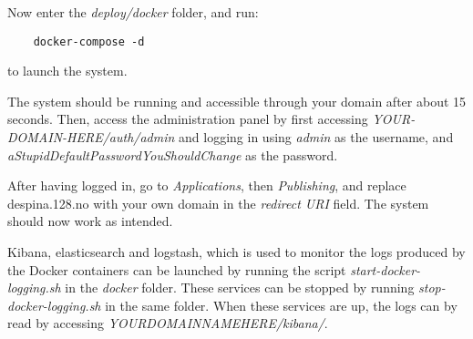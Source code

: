 Now enter the \textit{deploy/docker} folder, and run:
\begin{verbatim}
    docker-compose -d
\end{verbatim}
to launch the system.

The system should be running and accessible through your domain after about 15 seconds. Then, access the administration panel by first accessing \textit{YOUR-DOMAIN-HERE/auth/admin} and logging in using \textit{admin} as the username, and \textit{aStupidDefaultPasswordYouShouldChange} as the password.

After having logged in, go to \textit{Applications}, then \textit{Publishing}, and replace despina.128.no with your own domain in the \textit{redirect URI} field. The system should now work as intended.

Kibana, elasticsearch and logstash, which is used to monitor the logs produced by the Docker containers can be launched by running the script \textit{start-docker-logging.sh} in the \textit{docker} folder. These services can be stopped by running \textit{stop-docker-logging.sh} in the same folder. When these services are up, the logs can by read by accessing \textit{YOURDOMAINNAMEHERE/kibana/}.